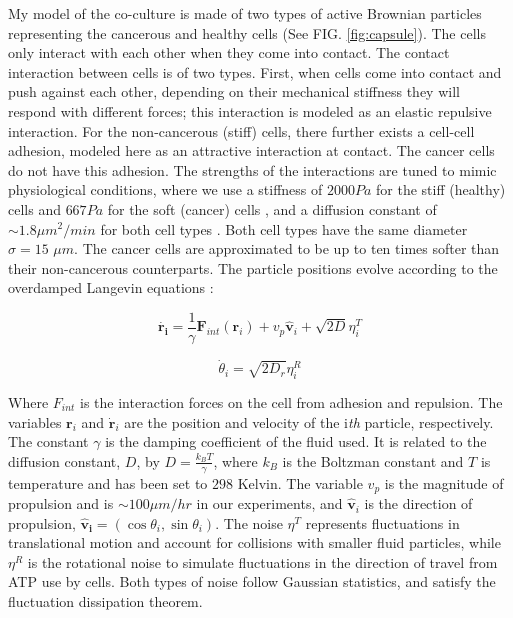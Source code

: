 \documentclass[aps,prb,twocolumn,groupedaddress,nofootinbib,floatfix]{revtex4}
\begin{document}
My model of the co-culture is made of two types of active Brownian particles representing the cancerous and healthy cells (See FIG. \ref{fig:capsule}). 
The cells only interact with each other when they come into contact.
The contact interaction between cells is of two types.
First, when cells come into contact and push against each other, depending on their mechanical stiffness they will respond with different forces; this interaction is modeled as an elastic repulsive interaction.
For the non-cancerous (stiff) cells, there further exists a cell-cell adhesion, modeled here as an attractive interaction at contact.
The cancer cells do not have this adhesion.
The strengths of the interactions are tuned to mimic physiological conditions, where we use a stiffness of $2000 Pa$ for the stiff  (healthy) cells and $667 Pa$ for the soft (cancer) cells \cite{Lee},
and a diffusion constant of $\sim 1.8 \mu m^2 /min$ for both cell types \cite{Mingming}.
Both cell types have the same diameter  $\sigma = 15$ $\mu m$.
The cancer cells are approximated to be up to ten times softer than their non-cancerous counterparts.
The particle positions evolve according to the overdamped Langevin equations \cite{Lemons,RednerBaskaran,FilyMarchetti,Butcher}: 

\begin{equation}
  \bm{\dot{\bm{r}_i}} = \frac{1}{\gamma}\bm{F}_{int}(\bm{r}_i) + v_p\hat{\bm{v}}_i+\sqrt{2D}\eta_i^T
\end{equation}

\begin{equation}
  \dot{\theta}_i=\sqrt{2D_r}\eta^R_i
\end{equation}

Where $F_{int}$ is the interaction forces on the cell from adhesion and repulsion.
The variables $\bm{r}_i$ and $\dot{\bm{r}}_i$ are the position and velocity of the i\textit{th} particle, respectively.
The constant $\gamma$ is the damping coefficient of the fluid used. It is related to the
diffusion constant, $D$, by $D=\frac{k_BT}{\gamma}$, where $k_B$ is the Boltzman constant and $T$ is temperature and has been set to $298$ Kelvin. 
The variable $v_p$ is the magnitude of propulsion and is $\sim 100 \mu m/hr$ in our experiments, and $\bm{\hat{v}}_i$ is the direction of propulsion, $\bm{\hat{v}_i}=(\cos \theta_i, \sin \theta_i)$.
The noise $\eta^T$ represents fluctuations in translational motion and account for collisions with smaller fluid particles, while
$\eta^R$ is the rotational noise to simulate fluctuations in the direction of travel from ATP use by cells. Both types of noise follow Gaussian statistics, and satisfy the fluctuation dissipation theorem.
\end{document}
